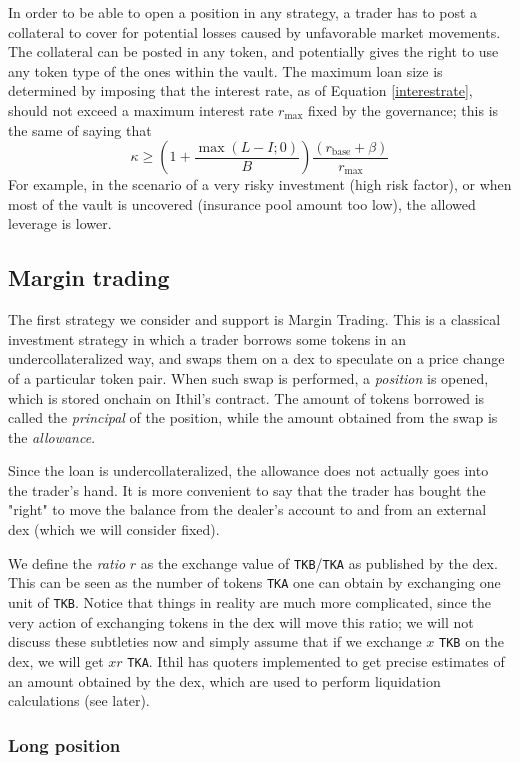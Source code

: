 \documentclass[a4paper,10 pt]{article}
\theoremstyle{definition}
\begin{document}
In order to be able to open a position in any strategy, a trader has to post a collateral to cover for potential losses caused by unfavorable market movements. The collateral can be posted in any token, and potentially gives the right to use any token type of the ones within the vault. The maximum loan size is determined by imposing that the interest rate, as of Equation \eqref{interestrate}, should not exceed a maximum interest rate $r_{\text{max}}$ fixed by the governance; this is the same of saying that 
$$\kappa \ge  \left(1+\frac{\max{(L-I;0)}}{B}\right)\frac{(r_{\text{base}} + \beta)}{r_{\text{max}}}$$
 For example, in the scenario of a very risky investment (high risk factor), or when most of the vault is uncovered (insurance pool amount too low), the allowed leverage is lower.

\subsection{Margin trading}

The first strategy we consider and support is Margin Trading. This is a classical investment strategy in which a trader borrows some tokens in an undercollateralized way, and swaps them on a dex to speculate on a price change of a particular token pair. When such swap is performed, a {\it position} is opened, which is stored onchain on Ithil's contract. The amount of tokens borrowed is called the {\it principal} of the position, while the amount obtained from the swap is the {\it allowance}.

Since the loan is undercollateralized, the allowance does not actually goes into the trader's hand. It is more convenient to say that the trader has bought the "right" to move the balance from the dealer's account to and from an external dex (which we will consider fixed).

We define the {\it ratio} $r$ as the exchange value of \verb|TKB|/\verb|TKA| as published by the dex. This can be seen as the number of tokens \verb|TKA| one can obtain by exchanging one unit of \verb|TKB|. Notice that things in reality are much more complicated, since the very action of exchanging tokens in the dex will move this ratio; we will not discuss these subtleties now and simply assume that if we exchange $x$ \verb|TKB| on the dex, we will get $xr$ \verb|TKA|. Ithil has quoters implemented to get precise estimates of an amount obtained by the dex, which are used to perform liquidation calculations (see later).

\subsubsection{Long position}
\end{document}
